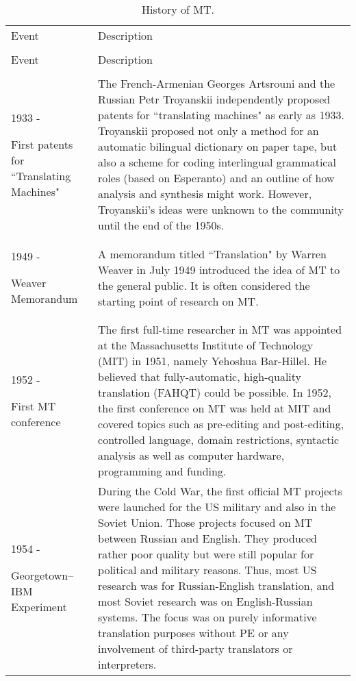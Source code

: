  \begin{longtable}[c]{ |>{\raggedright}p{2.8cm}||p{8.5cm}|  }
 \caption{History of MT.\label{long}}\\\hline
 \multicolumn{2}{| c |}{History of MT}\\\hline
 Event & Description\\\hline
 \endfirsthead
 
 \hline
 \multicolumn{2}{|c|}{History of MT}\\ \hline
 Event & Description\\ \hline
 \endhead
 
 \hline
 \endfoot
 
 \hline
 \multicolumn{2}{| c |}{Future}\\ \hline\hline
 \endlastfoot
 
 1933 - 
 
 First patents for ``Translating Machines" & The French-Armenian Georges Artsrouni and the Russian Petr Troyanskii independently proposed patents for ``translating machines" as early as 1933. Troyanskii proposed not only a method for an automatic bilingual dictionary on paper tape, but also a scheme for coding interlingual grammatical roles (based on Esperanto) and an outline of how analysis and synthesis might work. However, Troyanskii’s ideas were unknown to the community until the end of the 1950s.\\ \hline
 1949 - 
 
 Weaver Memorandum & A memorandum titled ``Translation" by Warren Weaver in July 1949 introduced the idea of MT to the general public. It is often considered the starting point of research on MT.\\ \hline
 1952 - 
 
 First MT conference & The first full-time researcher in MT was appointed at the Massachusetts Institute of Technology (MIT) in 1951, namely Yehoshua Bar-Hillel. He believed that fully-automatic, high-quality translation (FAHQT) could be possible. In 1952, the first conference on MT was held at MIT and covered topics such as pre-editing and post-editing, controlled language, domain restrictions, syntactic analysis as well as computer hardware, programming and funding.\\ \hline
 1954 - 
 
 Georgetown–IBM Experiment & During the Cold War, the first official MT projects were launched for the US military and also in the Soviet Union. Those projects focused on MT between Russian and English. They produced rather poor quality but were still popular for political and military reasons. Thus, most US research was for Russian-English translation, and most Soviet research was on English-Russian systems. The focus was on purely informative translation purposes without PE or any involvement of third-party translators or interpreters. 
 

\end{longtable}
